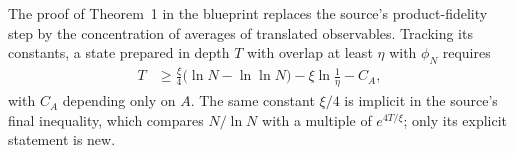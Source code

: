 \documentclass{article}
\begin{document}
The proof of Theorem~1 in the blueprint replaces the source's product-fidelity
step by the concentration of averages of translated observables. Tracking its
constants, a state prepared in depth $T$ with overlap at least $\eta$ with
$\phi_N$ requires
\begin{align}
    T
     & \ge\frac\xi4\bigl(\ln N-\ln\ln N\bigr)-\xi\ln\frac1\eta-C_A,
    \label{eq:mswc24_decaying_correlations_depth_constant}
\end{align}
with $C_A$ depending only on $A$. The same constant $\xi/4$ is implicit in the
source's final inequality, which compares $N/\ln N$ with a multiple of
$e^{4T/\xi}$; only its explicit statement is new.



\end{document}
